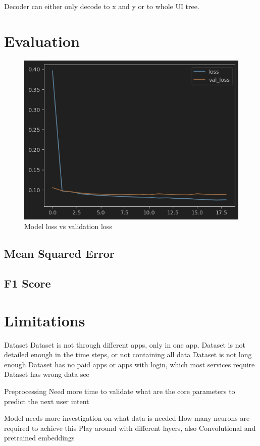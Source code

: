 Decoder can either only decode to x and y or to whole UI tree.

\section{Evaluation}

\begin{figure}[htbp!]
  \centering
  \includegraphics[width=\textwidth]{graphics/model_history_loss}
  \caption{Model loss vs validation loss}
  \label{fig:model_history_loss}
\end{figure}

\subsection{Mean Squared Error}
\subsection{F1 Score}
\section{Limitations}

Dataset
Dataset is not through different apps, only in one app.
Dataset is not detailed enough in the time steps, or not containing all data
Dataset is not long enough
Dataset has no paid apps or apps with login, which most services require
Dataset has wrong data see \cite{clay}

Preprocessing
Need more time to validate what are the core parameters to predict the next user intent


Model needs more investigation on what data is needed
How many neurons are required to achieve this
Play around with different layers, also Convolutional and pretrained embeddings
